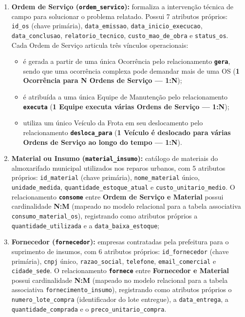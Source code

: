 \documentclass[12pt,a4paper]{article}
\begin{document}
\begin{enumerate}[resume]
  \item \textbf{Ordem de Serviço (\texttt{ordem\_servico}):} formaliza a intervenção técnica de campo para solucionar o problema relatado. Possui 7 atributos próprios: \texttt{id\_os} (chave primária), \texttt{data\_emissao}, \texttt{data\_inicio\_execucao}, \texttt{data\_conclusao}, \texttt{relatorio\_tecnico}, \texttt{custo\_mao\_de\_obra} e \texttt{status\_os}. Cada Ordem de Serviço articula três vínculos operacionais:
  \begin{itemize}
    \item é gerada a partir de uma única Ocorrência pelo relacionamento \textbf{\texttt{gera}}, sendo que uma ocorrência complexa pode demandar mais de uma OS (\textbf{1 Ocorrência para N Ordens de Serviço --- 1:N});
    \item é atribuída a uma única Equipe de Manutenção pelo relacionamento \textbf{\texttt{executa}} (\textbf{1 Equipe executa várias Ordens de Serviço --- 1:N});
    \item utiliza um único Veículo da Frota em seu deslocamento pelo relacionamento \textbf{\texttt{desloca\_para}} (\textbf{1 Veículo é deslocado para várias Ordens de Serviço ao longo do tempo --- 1:N}).
  \end{itemize}
  \item \textbf{Material ou Insumo (\texttt{material\_insumo}):} catálogo de materiais do almoxarifado municipal utilizados nos reparos urbanos, com 5 atributos próprios: \texttt{id\_material} (chave primária), \texttt{nome\_material} único, \texttt{unidade\_medida}, \texttt{quantidade\_estoque\_atual} e \texttt{custo\_unitario\_medio}. O relacionamento \textbf{\texttt{consome}} entre \textbf{Ordem de Serviço e Material} possui cardinalidade \textbf{N:M} (mapeado no modelo relacional para a tabela associativa \texttt{consumo\_material\_os}), registrando como atributos próprios a \texttt{quantidade\_utilizada} e a \texttt{data\_baixa\_estoque};
  \item \textbf{Fornecedor (\texttt{fornecedor}):} empresas contratadas pela prefeitura para o suprimento de insumos, com 6 atributos próprios: \texttt{id\_fornecedor} (chave primária), \texttt{cnpj} único, \texttt{razao\_social}, \texttt{telefone}, \texttt{email\_comercial} e \texttt{cidade\_sede}. O relacionamento \textbf{\texttt{fornece}} entre \textbf{Fornecedor e Material} possui cardinalidade \textbf{N:M} (mapeado no modelo relacional para a tabela associativa \texttt{fornecimento\_insumo}), registrando como atributos próprios o \texttt{numero\_lote\_compra} (identificador do lote entregue), a \texttt{data\_entrega}, a \texttt{quantidade\_comprada} e o \texttt{preco\_unitario\_compra}.
\end{enumerate}
\end{document}
